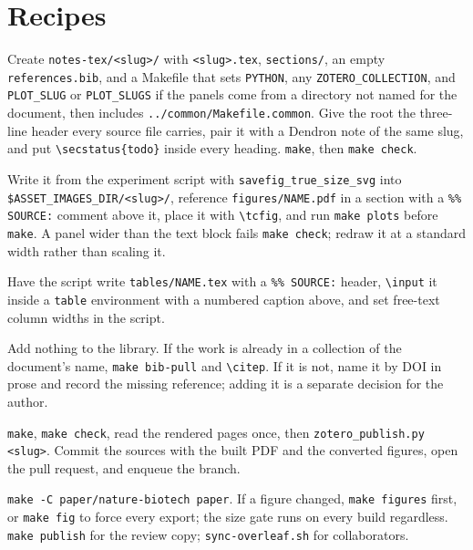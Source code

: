 
\section{Recipes}
\label{sec:recipes}

Create \texttt{notes-tex/<slug>/} with \texttt{<slug>.tex}, \texttt{sections/},
an empty \texttt{references.bib}, and a Makefile that sets \texttt{PYTHON}, any
\texttt{ZOTERO\_COLLECTION}, and \texttt{PLOT\_SLUG} or \texttt{PLOT\_SLUGS} if the
panels come from a directory not named for the document, then includes
\texttt{../common/Makefile.common}. Give the root the three-line header every
source file carries, pair it with a Dendron note of the same slug, and put
\texttt{\textbackslash secstatus\{todo\}} inside every heading. \texttt{make}, then
\texttt{make check}.

Write it from the experiment script with \texttt{savefig\_true\_size\_svg} into
\texttt{\$ASSET\_IMAGES\_DIR/<slug>/}, reference \texttt{figures/{}NAME.pdf} in a
section with a \texttt{\%\% SOURCE:} comment above it, place it with
\texttt{\textbackslash tcfig}, and run \texttt{make plots} before \texttt{make}. A
panel wider than the text block fails \texttt{make check}; redraw it at a standard
width rather than scaling it.

Have the script write \texttt{tables/NAME.tex} with a \texttt{\%\% SOURCE:} header,
\texttt{\textbackslash input} it inside a \texttt{table} environment with a
numbered caption above, and set free-text column widths in the script.

Add nothing to the library. If the work is already in a collection of the
document's name, \texttt{make bib-pull} and \texttt{\textbackslash citep}. If it is
not, name it by DOI in prose and record the missing reference; adding it is a
separate decision for the author.

\texttt{make}, \texttt{make check}, read the rendered pages once, then
\texttt{zotero\_publish.py <slug>}. Commit the sources with the built PDF and the
converted figures, open the pull request, and enqueue the branch.

\texttt{make -C paper/nature-biotech paper}. If a figure changed, \texttt{make
figures} first, or \texttt{make fig} to force every export; the size gate runs on
every build regardless. \texttt{make publish} for the review copy;
\texttt{sync-overleaf.sh} for collaborators.
